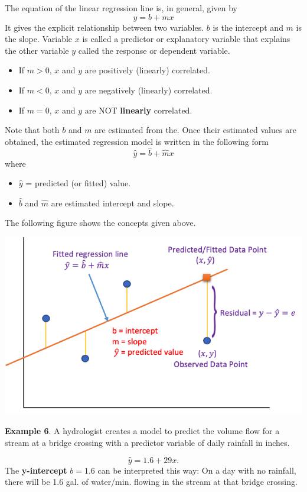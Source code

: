 \documentclass[
]{book}
\begin{document}
The equation of the linear regression line is, in general, given by
\[
y = b + m x
\]
It gives the explicit relationship between two variables. \(b\) is the intercept and \(m\) is the slope. Variable \(x\) is called a predictor or explanatory variable that explains the other variable \(y\) called the response or dependent variable.

\begin{itemize}
\item
  If \(m > 0\), \(x\) and \(y\) are positively (linearly) correlated.
\item
  If \(m < 0\), \(x\) and \(y\) are negatively (linearly) correlated.
\item
  If \(m = 0\), \(x\) and \(y\) are NOT \textbf{linearly} correlated.
\end{itemize}

Note that both \(b\) and \(m\) are estimated from the. Once their estimated values are obtained, the estimated regression model is written in the following form
\[
\hat{y} = \hat{b} + \hat{m} x
\]
where

\begin{itemize}
\item
  \(\hat{y}\) = predicted (or fitted) value.
\item
  \(\hat{b}\) and \(\hat{m}\) are estimated intercept and slope.
\end{itemize}

The following figure shows the concepts given above.

\begin{center}\includegraphics[width=0.5\linewidth]{week12/linearRegStructure} \end{center}

\textbf{Example 6}. A hydrologist creates a model to predict the volume flow for a stream at a bridge crossing with a predictor variable of daily rainfall in inches.

\[
\hat{y} = 1.6 + 29x.
\]
The \textbf{y-intercept} \(b = 1.6\) can be interpreted this way: On a day with no rainfall, there will be 1.6 gal. of water/min. flowing in the stream at that bridge crossing.
\end{document}
